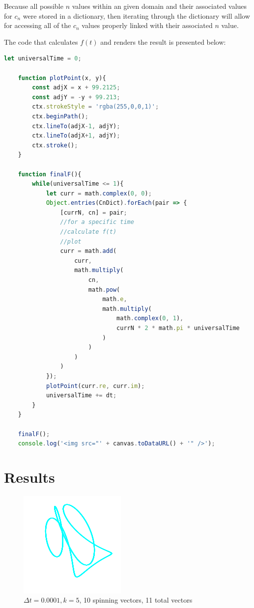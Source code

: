 \documentclass[letterpaper, 12pt]{article}
\begin{document}
Because all possible \(n\) values within an given domain and
their associated values for \(c_n\) were stored in a dictionary,
then iterating through the dictionary will allow for accessing
all of the \(c_n\) values properly linked with their associated \(n\) value.

The code that calculates \(f(t)\) and renders the result is presented below:
\begin{lstlisting}[language=JavaScript]
    let universalTime = 0;

    function plotPoint(x, y){
        const adjX = x + 99.2125;
        const adjY = -y + 99.213;
        ctx.strokeStyle = 'rgba(255,0,0,1)';
        ctx.beginPath();
        ctx.lineTo(adjX-1, adjY);
        ctx.lineTo(adjX+1, adjY);
        ctx.stroke();
    }

    function finalF(){
        while(universalTime <= 1){
            let curr = math.complex(0, 0);
            Object.entries(CnDict).forEach(pair => {
                [currN, cn] = pair;
                //for a specific time
                //calculate f(t)
                //plot
                curr = math.add(
                    curr,
                    math.multiply(
                        cn,
                        math.pow(
                            math.e,
                            math.multiply(
                                math.complex(0, 1),
                                currN * 2 * math.pi * universalTime
                            )
                        )
                    )
                )
            });
            plotPoint(curr.re, curr.im);
            universalTime += dt;
        }
    }

    finalF();
    console.log('<img src="' + canvas.toDataURL() + '" />');
\end{lstlisting}

\section{Results}

\begin{figure}[H]
    \centering
    \includegraphics[width=.5\textwidth]{5.png}
    \caption{\protect\(\Delta t = 0.0001, k = 5\), 10 spinning vectors, 11 total vectors}
\end{figure}
\end{document}

